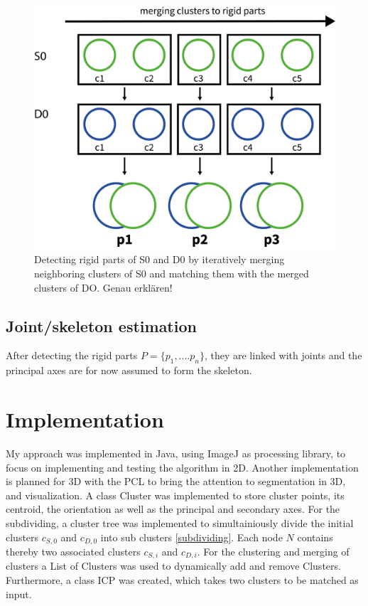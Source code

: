 \documentclass[notitlepage,english]{hgbreport}
\begin{document}
\begin{figure}
	\centering
	\includegraphics[width=0.7\linewidth]{ClusterChain}
	\caption{Detecting rigid parts of S0 and D0 by iteratively merging neighboring clusters of S0 and matching them with the merged clusters of DO. Genau erklären! }
	\label{fig:clusterChain}
\end{figure}

\subsection{Joint/skeleton estimation}

After detecting the rigid parts $ P =  \{ {p_1,....p_n}\}$, they are linked with joints and the principal axes are for now assumed to form the skeleton. 

\section{Implementation}

My approach was implemented in Java, using ImageJ as processing library, to focus on implementing and testing the algorithm in 2D. Another implementation is planned for 3D with the PCL to bring the attention to segmentation in 3D, and visualization. A class Cluster was implemented to store cluster points, its centroid, the orientation as well as the principal and secondary axes. For the subdividing, a cluster tree was implemented to simultainiously divide the initial clusters $c_{S, 0}$ and $c_{D, 0}$ into sub clusters \ref{subdividing}. Each node $N$ contains thereby two associated clusters $c_{S, i}$ and $c_{D, i}$. For the clustering and merging of clusters a List of Clusters was used to dynamically add and remove Clusters. Furthermore, a class ICP was created, which takes two clusters to be matched as input.
\end{document}
